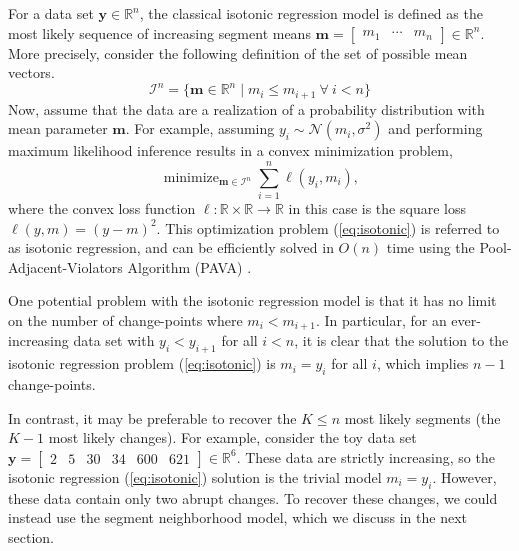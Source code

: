 \documentclass{article}
\DeclareMathOperator*{\Lik}{Lik}
\DeclareMathOperator*{\maximize}{maximize}
\DeclareMathOperator*{\minimize}{minimize}
\newcommand{\RR}{\mathbb R}
\begin{document}
For a data set $\mathbf y\in\RR^n$, the classical isotonic regression
model is defined as the most likely sequence of increasing segment
means $\mathbf m = \left[
\begin{array}{ccc}
  m_1& \cdots &m_n
\end{array}
\right]
\in\RR^n$. More precisely, consider the following definition
of the set of possible mean vectors.
\begin{equation}
  \mathcal I^n = \{\mathbf m\in\RR^n \mid m_i \leq m_{i+1} \ \forall\ i<n\}
\end{equation}
Now, assume that the data are a realization of a probability
distribution with mean parameter $\mathbf m$. For example, assuming
$y_i \sim \mathcal N(m_i, \sigma^2)$ 
and performing maximum likelihood inference results in a convex minimization problem,
\begin{equation}
  \label{eq:isotonic}
  \minimize_{\mathbf m\in\mathcal I^n} \sum_{i=1}^n \ell(y_i, m_i),
\end{equation}
where the convex loss function $\ell:\RR\times \RR\rightarrow\RR$ in
this case is the square loss $\ell(y, m) = (y-m)^2$. This optimization
problem (\ref{eq:isotonic}) is referred to as isotonic regression, and
can be efficiently solved in $O(n)$ time using the
Pool-Adjacent-Violators Algorithm (PAVA) \citep{isotonic-unifying}.

One potential problem with the isotonic regression model is that it
has no limit on the number of change-points where $m_i < m_{i+1}$. In
particular, for an ever-increasing data set with $y_i < y_{i+1}$ for
all $i<n$, it is clear that the solution to the isotonic regression
problem (\ref{eq:isotonic}) is $m_i=y_i$ for all $i$, which implies
$n-1$ change-points. 

In contrast, it may be preferable to recover the $K\leq n$ most likely
segments (the $K-1$ most likely changes). For example, consider the
toy data set $\mathbf y= \left[
\begin{array}{cccccc}
  2 & 5 & 30 & 34 & 600 & 621
\end{array}
\right] \in\RR^6$. These data are strictly increasing, so the isotonic
regression (\ref{eq:isotonic}) solution is the trivial model
$m_i=y_i$. However, these data contain only two abrupt changes. To
recover these changes, we could instead use the segment
neighborhood model, which we discuss in the next section.
\end{document}
